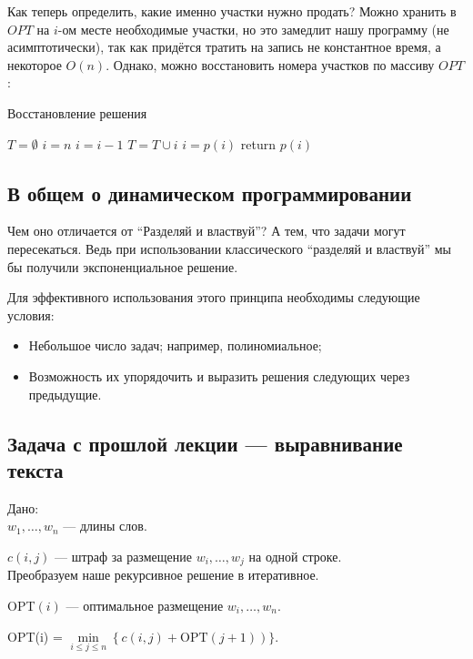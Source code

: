 \documentclass[a4paper,12pt]{article}
\begin{document}
Как теперь определить, какие именно участки нужно продать?
Можно хранить в $OPT$ на $i$-ом месте необходимые участки, но это замедлит нашу программу (не асимптотически), так как придётся тратить на запись не константное время, а некоторое $O(n)$.
Однако, можно восстановить номера участков по массиву $OPT$:

\begin{algorithm}
	\caption{Восстановление решения}
	\begin{algorithmic}
			\State \(T = \emptyset\)
			\State \(i = n\)
					\State \(i = i - 1\)
				\Else
					\State \(T = T \cup {i}\)
					\State \(i = p(i)\)
				\EndIf
			\EndWhile
			\State return \(p(i)\)
		\EndFunction
	\end{algorithmic}
\end{algorithm}

\subsection{В общем о динамическом программировании}
Чем оно отличается от ``Разделяй и властвуй''? А тем, что задачи могут пересекаться. Ведь при использовании классического ``разделяй и властвуй'' мы бы получили экспоненциальное решение. 

Для эффективного использования этого принципа необходимы следующие условия:
\begin{itemize}
    \item Небольшое число задач; например, полиномиальное;
    \item Возможность их упорядочить и выразить решения следующих через предыдущие.
\end{itemize}

\subsection{Задача с прошлой лекции --- выравнивание текста}

Дано:\\
$w_1,\ldots, w_n$ --- длины слов.

$c(i, j)$ --- штраф за размещение $w_i,\ldots, w_j$ на одной строке.\\

Преобразуем наше рекурсивное решение в итеративное.

OPT$(i)$ --- оптимальное размещение $w_i, \ldots, w_n$.

OPT(i) = $\min\limits_{i\leqslant j\leqslant n} \left\{ c(i, j)+ \mathrm{OPT}(j+1) \right)\}$.\\
\end{document}
